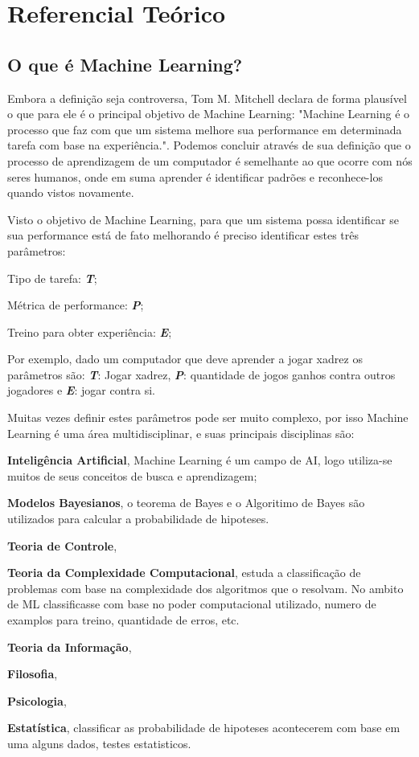 \chapter{Referencial Teórico}
\label{cap:referencial-reorico}

\section{O que é Machine Learning?}
\label{sec:oqueemachinelearning}

Embora a definição seja controversa, Tom M. Mitchell declara de forma plausível o que para ele é o principal objetivo de Machine Learning: "Machine Learning é o processo que faz com que um sistema melhore sua performance em determinada tarefa com base na experiência."\cite{Tom}. Podemos concluir através de sua definição que o processo de aprendizagem de um computador é semelhante ao que ocorre com nós seres humanos, onde em suma aprender é identificar padrões e reconhece-los quando vistos novamente.

Visto o objetivo de Machine Learning, para que um sistema possa identificar se sua performance está de fato melhorando é preciso identificar estes três parâmetros:
 \begin{alineascomponto}
	\item Tipo de tarefa: \textbf{\textit{T}};
	\item Métrica de performance: \textbf{\textit{P}};
	\item Treino para obter experiência: \textbf{\textit{E}};			
\end{alineascomponto}
Por exemplo, dado um computador que deve aprender a jogar xadrez os parâmetros são: \textbf{\textit{T}}: Jogar xadrez, \textbf{\textit{P}}: quantidade de jogos ganhos contra outros jogadores e
\textbf{\textit{E}}: jogar contra si.

Muitas vezes definir estes parâmetros pode ser muito complexo, por isso Machine Learning é uma área multidisciplinar, e suas principais disciplinas são: 
 
 \begin{alineascomponto}
	\item \textbf{Inteligência Artificial}, Machine Learning é um campo de AI, logo utiliza-se muitos de seus conceitos de busca e aprendizagem;  
	\item \textbf{Modelos Bayesianos}, o teorema de Bayes e o Algoritimo de Bayes são utilizados para calcular a probabilidade de hipoteses.
	\item \textbf{Teoria de Controle}, 
	\item \textbf{Teoria da Complexidade Computacional}, estuda a classificação de problemas com base na complexidade dos algoritmos que o resolvam. No ambito de ML classificasse com base no poder computacional utilizado, numero de examplos para treino, quantidade de erros, etc.   
	\item \textbf{Teoria da Informação}, 
	\item \textbf{Filosofia}, 
	\item \textbf{Psicologia}, 
	\item \textbf{Estatística}, classificar as probabilidade de hipoteses acontecerem com base em uma alguns dados, testes estatisticos.
\end{alineascomponto}
